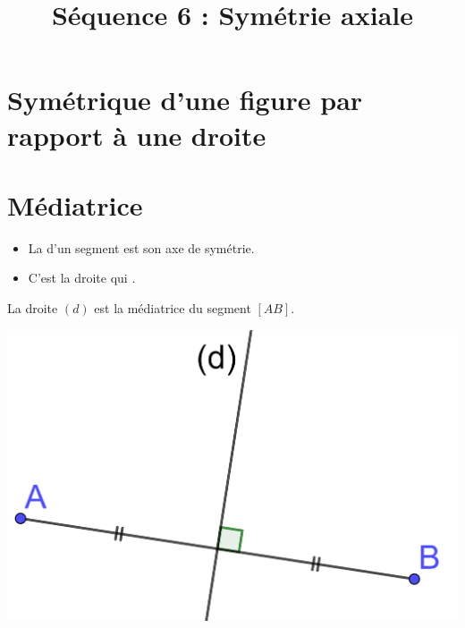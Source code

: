 \documentclass[xcolor={dvipsnames}]{beamer}
\title{Séquence 6 : Symétrie axiale}
\begin{document}
\begin{frame}
  \titlepage 
\end{frame}

\section{Symétrique d'une figure par rapport à une droite}
	

\section{Médiatrice}

\begin{frame}
	\begin{mydef}
		
		\begin{itemize}
			\item La  d'un segment est son axe de symétrie. \pause
			\item C'est la droite  qui .\pause 
		\end{itemize}
		
	\end{mydef}


\begin{myex}
	

	La droite $(d)$ est la médiatrice du segment $[AB]$.

	\begin{center}
		\includegraphics[scale=0.15]{med1}
	\end{center}
\end{myex}

\end{frame}
\end{document}
